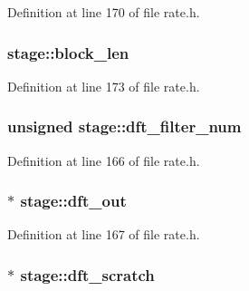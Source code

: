 Definition at line 170 of file rate.\+h.

\subsubsection[{\texorpdfstring{block\+\_\+len}{block_len}}]{ stage\+::block\+\_\+len}\hypertarget{structstage_a3ff2a6585177f53408eac1d1b008f7ea}{}\label{structstage_a3ff2a6585177f53408eac1d1b008f7ea}


Definition at line 173 of file rate.\+h.

\subsubsection[{\texorpdfstring{dft\+\_\+filter\+\_\+num}{dft_filter_num}}]{\setlength{\rightskip}{0pt plus 5cm}unsigned stage\+::dft\+\_\+filter\+\_\+num}\hypertarget{structstage_a57ec3f95768d18cf2e9ba23e604f65f5}{}\label{structstage_a57ec3f95768d18cf2e9ba23e604f65f5}


Definition at line 166 of file rate.\+h.

\subsubsection[{\texorpdfstring{dft\+\_\+out}{dft_out}}]{ $\ast$ stage\+::dft\+\_\+out}\hypertarget{structstage_a05610101ba9d584999f8b47860cd2baa}{}\label{structstage_a05610101ba9d584999f8b47860cd2baa}


Definition at line 167 of file rate.\+h.

\subsubsection[{\texorpdfstring{dft\+\_\+scratch}{dft_scratch}}]{$\ast$ stage\+::dft\+\_\+scratch}\hypertarget{structstage_af13ba0f02757fdc29e6d4a6cb493aed4}{}\label{structstage_af13ba0f02757fdc29e6d4a6cb493aed4}


